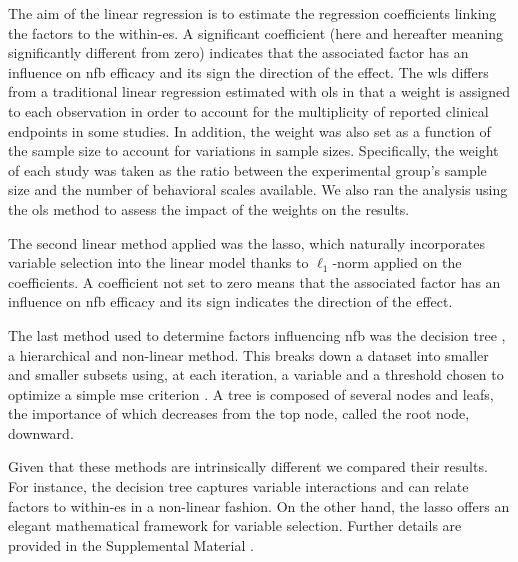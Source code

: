 The aim of the linear regression is to estimate the regression coefficients linking the factors
to the within-\gls{es}. A significant coefficient (here and hereafter meaning significantly different from zero) indicates
that the associated factor has an influence on \gls{nfb} efficacy and its sign the direction of the effect.
%
The \gls{wls} differs from a traditional linear regression estimated with \gls{ols} in that a weight is assigned 
to each observation in order to account for the multiplicity of reported clinical endpoints in some studies. In addition, the 
weight was also set as a function of the sample size to account for variations in sample sizes. Specifically, the weight of each study 
was taken as the ratio between the experimental group's sample size and the number of behavioral scales available.
We also ran the analysis using the \gls{ols} method to assess the impact of the weights on the results. 

The second linear method applied was the \gls{lasso}, which naturally incorporates variable selection 
into the linear model thanks to $\ell_1$-norm applied on the coefficients. A coefficient not set to zero means that 
the associated factor has an influence on \gls{nfb} efficacy and its sign indicates the direction of the effect.

The last method used to determine factors influencing \gls{nfb} was the decision tree \citep{Quinlan1986}, a hierarchical 
and non-linear method. This breaks down a dataset into smaller and smaller subsets using, at each iteration, a variable and 
a threshold chosen to optimize a simple \gls{mse} criterion \citep{James2013}. A tree is composed of several nodes and leafs, 
the importance of which decreases from the top node, called the root node, downward. 

Given that these methods are intrinsically different we compared their results. For instance, the decision
tree captures variable interactions and can relate factors to within-\gls{es} in a non-linear fashion. On the other hand, the
\gls{lasso} offers an elegant mathematical framework for variable selection. Further details are provided in the Supplemental Material
\citep{Supplementalmaterial}.















